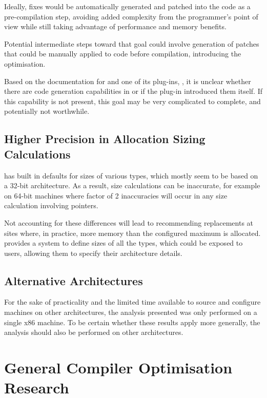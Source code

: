 Ideally, fixes would be automatically generated and patched into the code as a pre-compilation step, avoiding added complexity from the programmer's point of view while still taking advantage of performance and memory benefits.

Potential intermediate steps toward that goal could involve generation of patches that could be manually applied to code before compilation, introducing the optimisation.

Based on the documentation for  and one of its plug-ins, , it is unclear whether there are code generation capabilities in  or if the plug-in introduced them itself. If this capability is not present, this goal may be very complicated to complete, and potentially not worthwhile.

\subsection{Higher Precision in Allocation Sizing Calculations}

 has built in defaults for sizes of various types, which mostly seem to be based on a 32-bit architecture. As a result, size calculations can be inaccurate, for example on 64-bit machines where factor of 2 inaccuracies will occur in any size calculation involving pointers.

Not accounting for these differences will lead to  recommending replacements at sites where, in practice, more memory than the configured maximum is allocated.  provides a system to define sizes of all the types, which could be exposed to users, allowing them to specify their architecture details.

\subsection{Alternative Architectures}

For the sake of practicality and the limited time available to source and configure machines on other architectures, the analysis presented was only performed on a single x86 machine. To be certain whether these results apply more generally, the analysis should also be performed on other architectures.

\section{General Compiler Optimisation Research}

